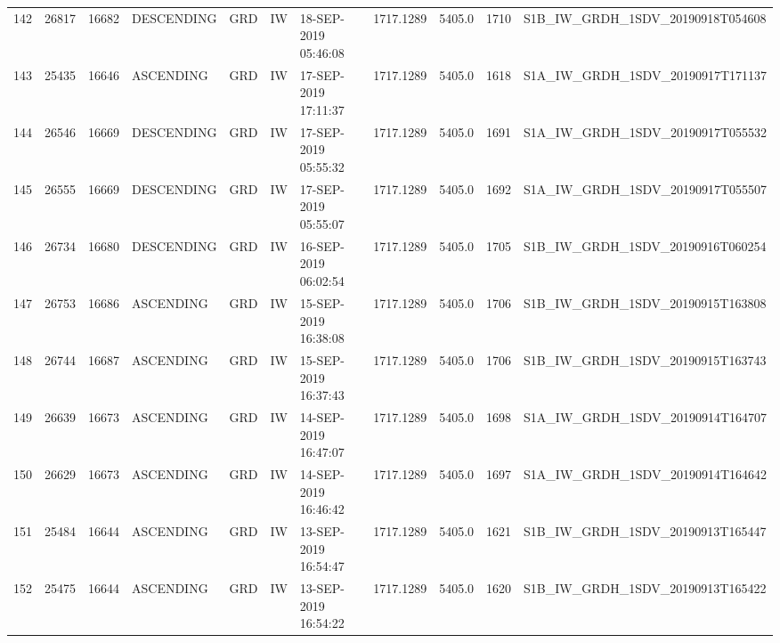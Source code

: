 \begin{tabular}{lrrllllllll}
142 &  26817 &   16682 &  DESCENDING &          GRD &              IW &  18-SEP-2019 05:46:08 &                  1717.1289 &          5405.0 &       1710 &  S1B\_IW\_GRDH\_1SDV\_20190918T054608 \\
143 &  25435 &   16646 &   ASCENDING &          GRD &              IW &  17-SEP-2019 17:11:37 &                  1717.1289 &          5405.0 &       1618 &  S1A\_IW\_GRDH\_1SDV\_20190917T171137 \\
144 &  26546 &   16669 &  DESCENDING &          GRD &              IW &  17-SEP-2019 05:55:32 &                  1717.1289 &          5405.0 &       1691 &  S1A\_IW\_GRDH\_1SDV\_20190917T055532 \\
145 &  26555 &   16669 &  DESCENDING &          GRD &              IW &  17-SEP-2019 05:55:07 &                  1717.1289 &          5405.0 &       1692 &  S1A\_IW\_GRDH\_1SDV\_20190917T055507 \\
146 &  26734 &   16680 &  DESCENDING &          GRD &              IW &  16-SEP-2019 06:02:54 &                  1717.1289 &          5405.0 &       1705 &  S1B\_IW\_GRDH\_1SDV\_20190916T060254 \\
147 &  26753 &   16686 &   ASCENDING &          GRD &              IW &  15-SEP-2019 16:38:08 &                  1717.1289 &          5405.0 &       1706 &  S1B\_IW\_GRDH\_1SDV\_20190915T163808 \\
148 &  26744 &   16687 &   ASCENDING &          GRD &              IW &  15-SEP-2019 16:37:43 &                  1717.1289 &          5405.0 &       1706 &  S1B\_IW\_GRDH\_1SDV\_20190915T163743 \\
149 &  26639 &   16673 &   ASCENDING &          GRD &              IW &  14-SEP-2019 16:47:07 &                  1717.1289 &          5405.0 &       1698 &  S1A\_IW\_GRDH\_1SDV\_20190914T164707 \\
150 &  26629 &   16673 &   ASCENDING &          GRD &              IW &  14-SEP-2019 16:46:42 &                  1717.1289 &          5405.0 &       1697 &  S1A\_IW\_GRDH\_1SDV\_20190914T164642 \\
151 &  25484 &   16644 &   ASCENDING &          GRD &              IW &  13-SEP-2019 16:54:47 &                  1717.1289 &          5405.0 &       1621 &  S1B\_IW\_GRDH\_1SDV\_20190913T165447 \\
152 &  25475 &   16644 &   ASCENDING &          GRD &              IW &  13-SEP-2019 16:54:22 &                  1717.1289 &          5405.0 &       1620 &  S1B\_IW\_GRDH\_1SDV\_20190913T165422 \\

\end{tabular}
